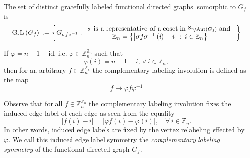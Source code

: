 \begin{definition}\label{defn:graceful-functional-graphs-set}
The set of distinct gracefully labeled functional directed graphs isomorphic to $G_{f}$ is 
\[
\text{GrL}\left(G_{f}\right)\,:=\left\{ G_{\sigma f\sigma^{-1}}:\begin{array}{c}
\sigma\text{ is a representative of a coset in }\nicefrac{\text{S}_{n}}{\text{Aut}\left(G_{f}\right)}\text{ and }\\
\mathbb{Z}_{n}=\left\{ \left|\sigma f\sigma^{-1}\left(i\right)-i\right|\,:\,i\in\mathbb{Z}_{n}\right\} 
\end{array}\right\} 
\]
\end{definition}
\begin{definition}\label{defn:complementary-labeling-symmetry}
If $\varphi=n-1-\text{id}$, i.e. $\varphi \in \mathbb{Z}_{n}^{\mathbb{Z}_{n}}$ such that
\[
\varphi(i)=n-1-i,\, \forall \,i\in \mathbb{Z}_{n},
\]
then for an arbitrary $f\in\mathbb{Z}_{n}^{\mathbb{Z}_{n}}$ the complementary labeling involution is defined as the map
\[
f \mapsto \varphi f \varphi^{-1}
\]
\end{definition}
Observe that for all $f\in \mathbb{Z}_{n}^{\mathbb{Z}_{n}}$ the complementary labeling involution fixes the induced edge label of each edge as seen from the equality
\begin{equation}
\left|f(i)-i\right|=\left|\varphi f(i)-\varphi(i)\right|,\quad\forall\,i\in\mathbb{Z}_{n}.
\end{equation}
In other words, induced edge labels are fixed by the vertex relabeling effected by $\varphi$. We call this induced edge label symmetry the \emph{complementary labeling symmetry} of the functional directed graph $G_f$.


